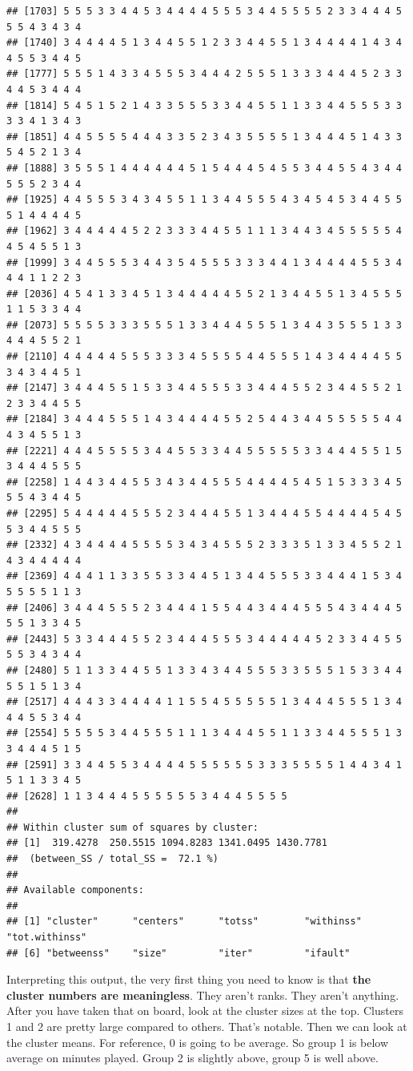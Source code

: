 \documentclass[
]{book}
\begin{document}
\begin{verbatim}
## [1703] 5 5 5 3 3 4 4 5 3 4 4 4 4 5 5 5 3 4 4 5 5 5 5 2 3 3 4 4 4 5 5 5 4 3 4 3 4
## [1740] 3 4 4 4 4 5 1 3 4 4 5 5 1 2 3 3 4 4 5 5 1 3 4 4 4 4 1 4 3 4 4 5 5 3 4 4 5
## [1777] 5 5 5 1 4 3 3 4 5 5 5 3 4 4 4 2 5 5 5 1 3 3 3 4 4 4 5 2 3 3 4 4 5 3 4 4 4
## [1814] 5 4 5 1 5 2 1 4 3 3 5 5 5 3 3 4 4 5 5 1 1 3 3 4 4 5 5 5 3 3 3 3 4 1 3 4 3
## [1851] 4 4 5 5 5 5 4 4 4 3 3 5 2 3 4 3 5 5 5 5 1 3 4 4 4 5 1 4 3 3 5 4 5 2 1 3 4
## [1888] 3 5 5 5 1 4 4 4 4 4 4 5 1 5 4 4 4 5 4 5 5 3 4 4 5 5 4 3 4 4 5 5 5 2 3 4 4
## [1925] 4 4 5 5 5 3 4 3 4 5 5 1 1 3 4 4 5 5 5 4 3 4 5 4 5 3 4 4 5 5 5 1 4 4 4 4 5
## [1962] 3 4 4 4 4 4 5 2 2 3 3 3 4 4 5 5 1 1 1 3 4 4 3 4 5 5 5 5 5 4 4 5 4 5 5 1 3
## [1999] 3 4 4 5 5 5 3 4 4 3 5 4 5 5 5 3 3 3 4 4 1 3 4 4 4 4 5 5 3 4 4 4 1 1 2 2 3
## [2036] 4 5 4 1 3 3 4 5 1 3 4 4 4 4 4 5 5 2 1 3 4 4 5 5 1 3 4 5 5 5 1 1 5 3 3 4 4
## [2073] 5 5 5 5 3 3 3 5 5 5 1 3 3 4 4 4 5 5 5 1 3 4 4 3 5 5 5 1 3 3 4 4 4 5 5 2 1
## [2110] 4 4 4 4 4 5 5 5 3 3 3 4 5 5 5 5 4 4 5 5 5 1 4 3 4 4 4 4 5 5 3 4 3 4 4 5 1
## [2147] 3 4 4 4 5 5 1 5 3 3 4 4 5 5 5 3 3 4 4 4 5 5 2 3 4 4 5 5 2 1 2 3 3 4 4 5 5
## [2184] 3 4 4 4 5 5 5 1 4 3 4 4 4 4 5 5 2 5 4 4 3 4 4 5 5 5 5 5 4 4 4 3 4 5 5 1 3
## [2221] 4 4 4 5 5 5 5 3 4 4 5 5 3 3 4 4 5 5 5 5 5 3 3 4 4 4 5 5 1 5 3 4 4 4 5 5 5
## [2258] 1 4 4 3 4 4 5 5 3 4 3 4 4 5 5 5 4 4 4 4 5 4 5 1 5 3 3 3 4 5 5 5 4 3 4 4 5
## [2295] 5 4 4 4 4 4 5 5 5 2 3 4 4 4 5 5 1 3 4 4 4 5 5 4 4 4 4 5 4 5 5 3 4 4 5 5 5
## [2332] 4 3 4 4 4 4 5 5 5 5 3 4 3 4 5 5 5 2 3 3 3 5 1 3 3 4 5 5 2 1 4 3 4 4 4 4 4
## [2369] 4 4 4 1 1 3 3 5 5 3 3 4 4 5 1 3 4 4 5 5 5 3 3 4 4 4 1 5 3 4 5 5 5 5 1 1 3
## [2406] 3 4 4 4 5 5 5 2 3 4 4 4 1 5 5 4 4 3 4 4 4 5 5 5 4 3 4 4 4 5 5 5 1 3 3 4 5
## [2443] 5 3 3 4 4 4 5 5 2 3 4 4 4 5 5 5 3 4 4 4 4 4 5 2 3 3 4 4 5 5 5 5 3 4 3 4 4
## [2480] 5 1 1 3 3 4 4 5 5 1 3 3 4 3 4 4 5 5 5 3 3 5 5 5 1 5 3 3 4 4 5 5 1 5 1 3 4
## [2517] 4 4 4 3 3 4 4 4 4 1 1 5 5 4 5 5 5 5 5 1 3 4 4 4 5 5 5 1 3 4 4 4 5 5 3 4 4
## [2554] 5 5 5 5 3 4 4 5 5 5 1 1 1 3 4 4 4 5 5 1 1 3 3 4 4 5 5 5 1 3 3 4 4 4 5 1 5
## [2591] 3 3 4 4 5 5 3 4 4 4 4 5 5 5 5 5 5 3 3 3 5 5 5 5 1 4 4 3 4 1 5 1 1 3 3 4 5
## [2628] 1 1 3 4 4 4 5 5 5 5 5 5 3 4 4 4 5 5 5 5
## 
## Within cluster sum of squares by cluster:
## [1]  319.4278  250.5515 1094.8283 1341.0495 1430.7781
##  (between_SS / total_SS =  72.1 %)
## 
## Available components:
## 
## [1] "cluster"      "centers"      "totss"        "withinss"     "tot.withinss"
## [6] "betweenss"    "size"         "iter"         "ifault"
\end{verbatim}

Interpreting this output, the very first thing you need to know is that \textbf{the cluster numbers are meaningless}. They aren't ranks. They aren't anything. After you have taken that on board, look at the cluster sizes at the top. Clusters 1 and 2 are pretty large compared to others. That's notable. Then we can look at the cluster means. For reference, 0 is going to be average. So group 1 is below average on minutes played. Group 2 is slightly above, group 5 is well above.
\end{document}
